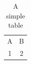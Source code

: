 \documentclass{article}
\begin{document}
\begin{table}
\centering
\begin{tabular}{cc}
A & B \\
1 & 2 \\
\end{tabular}
\caption{A simple table}
\end{table}
\end{document}
